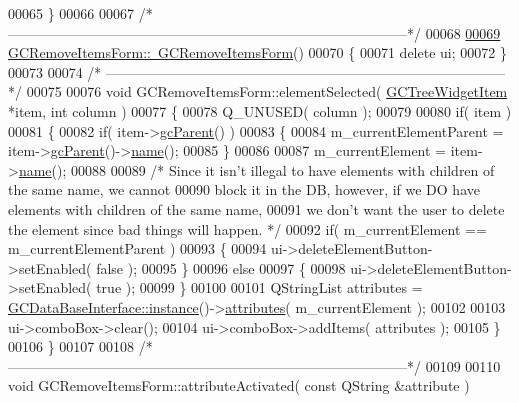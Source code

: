 \begin{DoxyCode}
00065 \}
00066 
00067 \textcolor{comment}{/*
      --------------------------------------------------------------------------------------*/}
00068 
\hypertarget{gcremoveitemsform_8cpp_source_l00069}{}\hyperlink{class_g_c_remove_items_form_a9cf2b70d83b8f13e0283a76ef62b47d2}{00069} \hyperlink{class_g_c_remove_items_form_a9cf2b70d83b8f13e0283a76ef62b47d2}{GCRemoveItemsForm::~GCRemoveItemsForm}()
00070 \{
00071   \textcolor{keyword}{delete} ui;
00072 \}
00073 
00074 \textcolor{comment}{/*
      --------------------------------------------------------------------------------------*/}
00075 
00076 \textcolor{keywordtype}{void} GCRemoveItemsForm::elementSelected( \hyperlink{class_g_c_tree_widget_item}{GCTreeWidgetItem} *item, \textcolor{keywordtype}{int} column )
00077 \{
00078   Q\_UNUSED( column );
00079 
00080   \textcolor{keywordflow}{if}( item )
00081   \{
00082     \textcolor{keywordflow}{if}( item->\hyperlink{class_g_c_tree_widget_item_a1125dbc55a8ba3e50662b8258cb35fdf}{gcParent}() )
00083     \{
00084       m\_currentElementParent = item->\hyperlink{class_g_c_tree_widget_item_a1125dbc55a8ba3e50662b8258cb35fdf}{gcParent}()->\hyperlink{class_g_c_tree_widget_item_a3af8c66a690cd55986a38b996a375ba4}{name}();
00085     \}
00086 
00087     m\_currentElement = item->\hyperlink{class_g_c_tree_widget_item_a3af8c66a690cd55986a38b996a375ba4}{name}();
00088 
00089     \textcolor{comment}{/* Since it isn't illegal to have elements with children of the same name,
       we cannot}
00090 \textcolor{comment}{      block it in the DB, however, if we DO have elements with children of the
       same name,}
00091 \textcolor{comment}{      we don't want the user to delete the element since bad things will
       happen. */}
00092     \textcolor{keywordflow}{if}( m\_currentElement == m\_currentElementParent )
00093     \{
00094       ui->deleteElementButton->setEnabled( \textcolor{keyword}{false} );
00095     \}
00096     \textcolor{keywordflow}{else}
00097     \{
00098       ui->deleteElementButton->setEnabled( \textcolor{keyword}{true} );
00099     \}
00100 
00101     QStringList attributes = \hyperlink{class_g_c_data_base_interface_a1baea9c0667aa8b610ec30076fcab84c}{GCDataBaseInterface::instance}()->\hyperlink{class_g_c_data_base_interface_afb1e49e08f98ca453f9ac66340a35642}{attributes}( 
      m\_currentElement );
00102 
00103     ui->comboBox->clear();
00104     ui->comboBox->addItems( attributes );
00105   \}
00106 \}
00107 
00108 \textcolor{comment}{/*
      --------------------------------------------------------------------------------------*/}
00109 
00110 \textcolor{keywordtype}{void} GCRemoveItemsForm::attributeActivated( \textcolor{keyword}{const} QString &attribute )

\end{DoxyCode}
